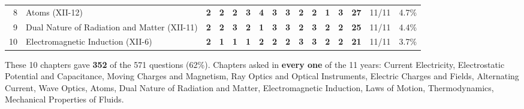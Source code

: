 \documentclass[10pt,a4paper]{article}
\begin{document}
{\begin{tabularx}{\linewidth}{@{}r>{\raggedright\arraybackslash}X*{11}{c}ccc@{}}
8 & Atoms {\scriptsize(XII-12)} & \textbf{2} & \textbf{2} & \textbf{2} & \textbf{3} & \textbf{4} & \textbf{3} & \textbf{3} & \textbf{2} & \textbf{2} & \textbf{1} & \textbf{3} & \textbf{27} & 11/11 & 4.7\%\\
9 & Dual Nature of Radiation and Matter {\scriptsize(XII-11)} & \textbf{2} & \textbf{2} & \textbf{3} & \textbf{2} & \textbf{1} & \textbf{3} & \textbf{3} & \textbf{2} & \textbf{3} & \textbf{2} & \textbf{2} & \textbf{25} & 11/11 & 4.4\%\\
10 & Electromagnetic Induction {\scriptsize(XII-6)} & \textbf{2} & \textbf{1} & \textbf{1} & \textbf{1} & \textbf{2} & \textbf{2} & \textbf{2} & \textbf{3} & \textbf{3} & \textbf{2} & \textbf{2} & \textbf{21} & 11/11 & 3.7\%\\
\bottomrule\end{tabularx}}\par\smallskip
{\small These 10 chapters gave \textbf{352} of the 571 questions (62\%).
Chapters asked in \textbf{every one} of the 11 years: Current Electricity, Electrostatic Potential and Capacitance, Moving Charges and Magnetism, Ray Optics and Optical Instruments, Electric Charges and Fields, Alternating Current, Wave Optics, Atoms, Dual Nature of Radiation and Matter, Electromagnetic Induction, Laws of Motion, Thermodynamics, Mechanical Properties of Fluids.}\par\clearpage
\end{document}
